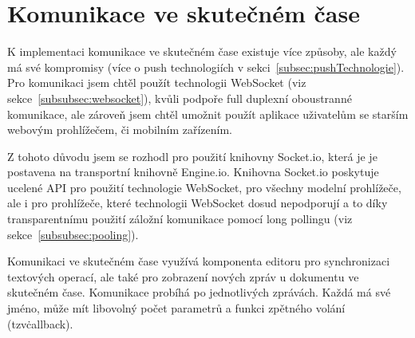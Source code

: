 
\section{Komunikace ve skutečném čase}\label{sec:komunikaceVeSkutečnémČase}

K implementaci komunikace ve skutečném čase existuje více způsoby, ale každý má své kompromisy (více o push technologiích v sekci~\ref{subsec:pushTechnologie}).
Pro komunikaci jsem chtěl použít technologii WebSocket (viz sekce~\ref{subsubsec:websocket}), kvůli podpoře full duplexní oboustranné komunikace, ale zároveň jsem chtěl umožnit použít aplikace uživatelům se starším webovým prohlížečem, či mobilním zařízením.

Z tohoto důvodu jsem se rozhodl pro použití knihovny Socket.io, která je je postavena na transportní knihovně Engine.io.
Knihovna Socket.io poskytuje ucelené \gls{API} pro použití technologie WebSocket, pro všechny modelní prohlížeče, ale i pro prohlížeče, které technologii WebSocket dosud nepodporují a to díky transparentnímu použití záložní komunikace pomocí long pollingu (viz sekce~\ref{subsubsec:pooling}).

Komunikaci ve skutečném čase využívá komponenta editoru pro synchronizaci textových operací, ale také pro zobrazení nových zpráv u dokumentu ve skutečném čase.
Komunikace probíhá po jednotlivých zprávách.
Každá má své jméno, může mít libovolný počet parametrů a funkci zpětného volání (tzv\. callback).
